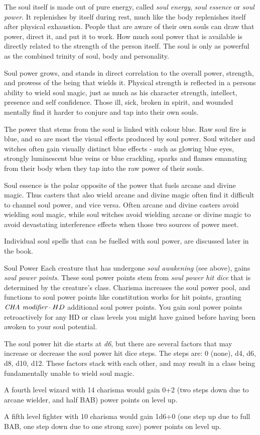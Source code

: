 The soul itself is made out of pure energy, called \emph{soul energy},
\emph{soul essence} or \emph{soul power}. It replenishes by itself during rest,
much like the body replenishes itself after physical exhaustion. People that
are aware of their own souls can draw that power, direct it, and put it to
work. How much soul power that is available is directly related to the
strength of the person itself. The soul is only as powerful as the combined
trinity of soul, body and personality.

Soul power grows, and stands in direct correlation to the overall power,
strength, and prowess of the being that wields it. Physical strength is
reflected in a persons ability to wield soul magic, just as much as his
character strength, intellect, presence and self confidence. Those ill, sick,
broken in spirit, and wounded mentally find it harder to conjure and tap into
their own souls.

The power that stems from the soul is linked with colour blue. Raw soul fire
is blue, and so are most the visual effects produced by soul power. Soul
witcher and witches often gain visually distinct blue effects - such as
glowing blue eyes, strongly luminescent blue veins or blue crackling, sparks
and flames emanating from their body when they tap into the raw power of
their souls.

Soul essence is the polar opposite of the power that fuels arcane and divine
magic. Thus casters that also wield arcane and divine magic often find it
difficult to channel soul power, and vice versa. Often arcane and divine
casters avoid wielding soul magic, while soul witches avoid wielding arcane or
divine magic to avoid devastating interference effects when those two sources
of power meet.

Individual soul spells that can be fuelled with soul power, are discussed
later in the book.

\begin{35e}{Soul Power}
  Each creature that has undergone \emph{soul awakening} (see above), 
  gains \emph{soul power points}. These soul power points stem from \emph{
  soul power hit dice} that is determined by the creature's class. 
  Charisma increases the soul power pool, and functions to soul power 
  points like constitution works for hit points, granting $ \emph{CHA 
  modifier} \cdot HD $ additional soul power points. You gain soul power 
  points retroactively for any HD or class levels you might have gained   
  before having been awoken to your soul potential.

  The soul power hit die starts at \emph{d6}, but there are several factors
  that may increase or decrease the soul power hit dice steps. The steps are:
  0 (none), d4, d6, d8, d10, d12. These factors stack with each other, and may
  result in a class being fundamentally unable to wield soul magic.

  A fourth level wizard with 14 charisma would gain 0+2 (two steps down due to
  arcane wielder, and half BAB) power points on level up.

  A fifth level fighter with 10 charisma would gain 1d6+0 (one step up due to
  full BAB, one step down due to one strong save) power points on level up.
\end{35e}

